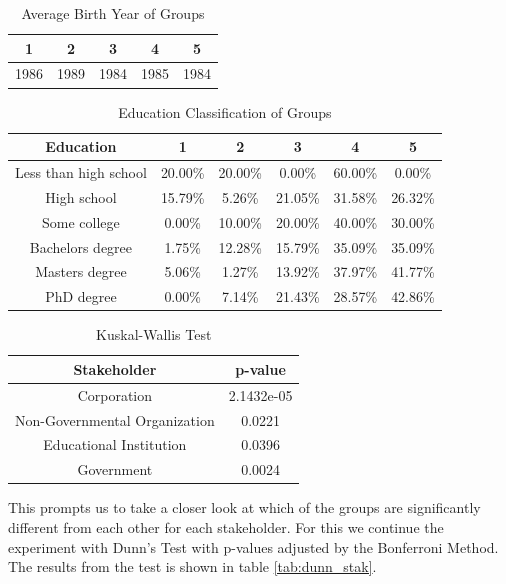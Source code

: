 \begin{table}[h!]
  \centering
  \caption{Average Birth Year of Groups}
  \label{tab:year_stak}
  \begin{tabular}{ccccc}
    \toprule
     1&2&3&4&5\\
    \midrule
	1986& 1989& 1984& 1985& 1984\\
    \bottomrule
  \end{tabular}
\end{table}


\begin{table}[h!]
  \centering
  \caption{Education Classification of Groups}
  \label{tab:edu_stak}
  \begin{tabular}{cccccc}
    \toprule
     Education&1&2&3&4&5\\
    \midrule
    
Less than high school	&20.00\%	&20.00\%	&0.00\%	&60.00\%	&0.00\%\\
High school	& 15.79\%&	5.26\%	&21.05\%	&31.58\%	&26.32\%\\
Some college	 & 0.00\%&	10.00\%	&20.00\%	&40.00\%&	30.00\%\\
Bachelors degree 	&1.75\%	&12.28\%&	15.79\%	&35.09\%	&35.09\%\\
Masters degree	&5.06\%	&1.27\%	&13.92\%	&37.97\%	&41.77\%\\
PhD degree	&0.00\%	&7.14\%	&21.43\%	&28.57\%	&42.86\%\\
    \bottomrule
  \end{tabular}
\end{table}


\begin{table}[h!]
  \centering
  \caption{Kuskal-Wallis Test}
  \label{tab:kw_stak}
  \begin{tabular}{cc}
    \toprule
     Stakeholder & p-value \\
    \midrule
    Corporation & 2.1432e-05 \\
    Non-Governmental Organization & 0.0221\\
    Educational Institution & 0.0396\\
    Government & 0.0024\\ 
    \bottomrule
  \end{tabular}
\end{table}

This prompts us to take a closer look at which of the groups are significantly different from each other for each stakeholder. For this we continue the experiment with Dunn's Test with p-values adjusted by the Bonferroni Method. The results from the test is shown in table \ref{tab:dunn_stak}.

